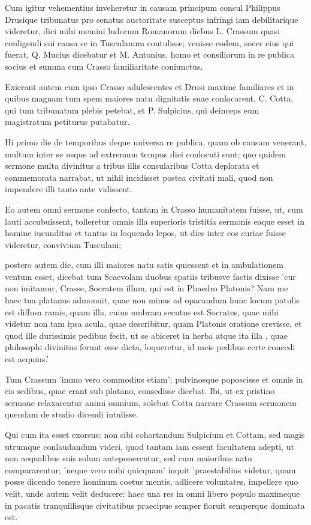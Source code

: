  Cum igitur vehementius inveheretur in causam principum consul Philippus Drusique tribunatus pro senatus auctoritate susceptus infringi iam debilitarique videretur, dici mihi memini ludorum Romanorum diebus L. Crassum quasi conligendi sui causa se in Tusculanum contulisse; venisse eodem, socer eius qui fuerat, Q. Mucius dicebatur et M. Antonius, homo et consiliorum in re publica socius et summa cum Crasso familiaritate coniunctus.

 Exierant autem cum ipso Crasso adulescentes et Drusi maxime familiares et in quibus magnam tum spem maiores natu dignitatis suae conlocarent, C. Cotta, qui tum tribunatum plebis petebat, et P. Sulpicius, qui deinceps eum magistratum petiturus putabatur.

 Hi primo die de temporibus deque universa re publica, quam ob causam venerant, multum inter se usque ad extremum tempus diei conlocuti sunt; quo quidem sermone multa divinitus a tribus illis consularibus Cotta deplorata et commemorata narrabat, ut nihil incidisset postea civitati mali, quod non impendere illi tanto ante vidissent.

 Eo autem omni sermone confecto, tantam in Crasso humanitatem fuisse, ut, cum lauti accubuissent, tolleretur omnis illa superioris tristitia sermonis eaque esset in homine iucunditas et tantus in loquendo lepos, ut dies inter eos curiae fuisse videretur, convivium Tusculani;

 postero autem die, cum illi maiores natu satis quiessent et in ambulationem ventum esset, dicebat tum Scaevolam duobus spatiis tribusve factis dixisse 'cur non imitamur, Crasse, Socratem illum, qui est in Phaedro Platonis? Nam me haec tua platanus admonuit, quae non minus ad opacandum hunc locum patulis est diffusa ramis, quam illa, cuius umbram secutus est Socrates, quae mihi videtur non tam ipsa acula, quae describitur, quam Platonis oratione crevisse, et quod ille durissimis pedibus fecit, ut se abiceret in herba atque ita illa , quae philosophi divinitus ferunt esse dicta, loqueretur, id meis pedibus certe concedi est aequius.'

 Tum Crassum 'immo vero commodius etiam'; pulvinosque poposcisse et omnis in eis sedibus, quae erant sub platano, consedisse dicebat. Ibi, ut ex pristino sermone relaxarentur animi omnium, solebat Cotta narrare Crassum sermonem quendam de studio dicendi intulisse.

 Qui cum ita esset exorsus: non sibi cohortandum Sulpicium et Cottam, sed magis utrumque conlaudandum videri, quod tantam iam essent facultatem adepti, ut non aequalibus suis solum anteponerentur, sed cum maioribus natu compararentur; 'neque vero mihi quicquam' inquit 'praestabilius videtur, quam posse dicendo tenere hominum coetus mentis, adlicere voluntates, impellere quo velit, unde autem velit deducere: haec una res in omni libero populo maximeque in pacatis tranquillisque civitatibus praecipue semper floruit semperque dominata est.

